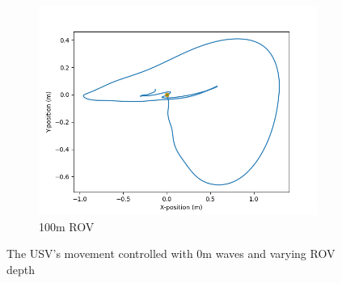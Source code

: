\documentclass[class=article, crop=false]{standalone}
\begin{document}
\begin{figure}
\begin{subfigure}{0.7\textwidth}
        \includegraphics{scenario1/rov-100m/0.0m/usv_position_controlled}
        \caption{100m ROV}
    \end{subfigure}
    \caption{The USV's movement controlled with 0m waves and varying ROV depth}
    \label{fig:0-controlled}
\end{figure}
\end{document}
